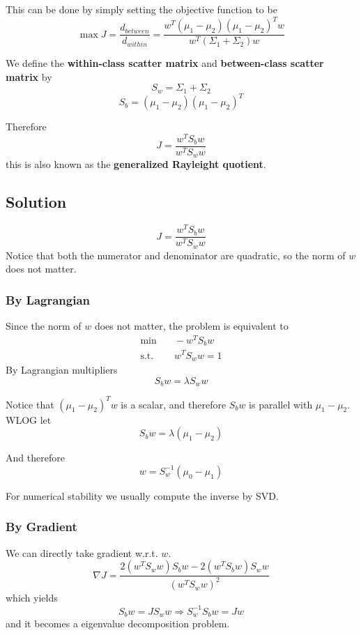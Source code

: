         This can be done by simply setting the objective function to be
        \[ \max J = \frac{d_{between}}{d_{within}} = \frac{w^T(\mu_1-\mu_2)(\mu_1-\mu_2)^Tw}{w^T(\Sigma_1 + \Sigma_2)w} \]

        We define the \textbf{within-class scatter matrix} and \textbf{between-class scatter matrix} by
        \[ S_w = \Sigma_1 + \Sigma_2 \]
        \[ S_b = (\mu_1 - \mu_2)(\mu_1-\mu_2)^T \]

        Therefore
        \[ J = \frac{w^TS_bw}{w^TS_ww} \]
        this is also known as the \textbf{generalized Rayleight quotient}.

    \subsection{Solution}
        \[ J = \frac{w^TS_bw}{w^TS_ww} \]
        Notice that both the numerator and denominator are quadratic, so the norm of $w$ does not matter.

        \subsubsection{By Lagrangian}
        Since the norm of $w$ does not matter, the problem is equivalent to
        \begin{align*}
            \min &\quad -w^TS_bw\\
            \text{s.t.} &\quad w^TS_ww=1
        \end{align*}
        By Lagrangian multipliers
        \[ S_bw = \lambda S_ww \]

        Notice that $(\mu_1-\mu_2)^Tw$ is a scalar, and therefore $S_bw$ is parallel with $\mu_1-\mu_2$. WLOG let
        \[ S_bw = \lambda(\mu_1-\mu_2) \]

        And therefore
        \[ w = S_w^{-1}(\mu_0-\mu_1) \]

        \begin{remark}
            For numerical stability we usually compute the inverse by SVD.
        \end{remark}

        \subsubsection{By Gradient}
        We can directly take gradient w.r.t. $w$.
        \[ \nabla J = \frac{2(w^TS_ww)S_bw-2(w^TS_bw)S_ww}{(w^TS_ww)^2} \]
        which yields
        \[ S_bw=JS_ww \Longrightarrow S_w^{-1}S_bw = Jw \]
        and it becomes a eigenvalue decomposition problem.

